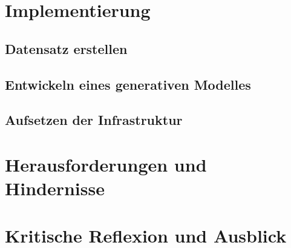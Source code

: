 \documentclass[12pt,a4paper]{article}
\begin{document}
\section{Implementierung}

\subsection{Datensatz erstellen}

\subsection{Entwickeln eines generativen Modelles}

\subsection{Aufsetzen der Infrastruktur}

\section{Herausforderungen und Hindernisse}

\section{Kritische Reflexion und Ausblick} 

\newpage
{}
\small
\printbibliography	
\end{document}
